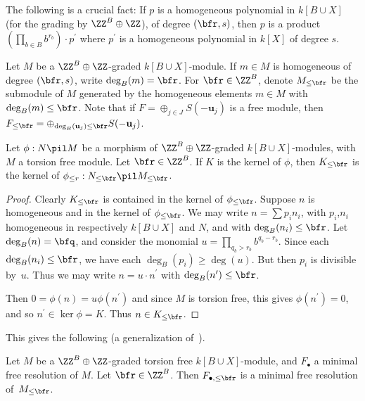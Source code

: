 The following is a crucial fact: If $p$ is a homogeneous
polynomial in $k[B \cup X]$ (for the grading by $\ZZ^B \oplus \ZZ$),
of degree $(\bfr,s)$, then $p$ is a product
$(\prod_{b \in B}b^{r_b}) \cdot p^\prime$ where $p^\prime$ is a homogeneous
polynomial in $k[X]$ of degree $s$.

Let $M$ be a $\ZZ^B \oplus \ZZ$-graded 
$k[B \cup X]$-module. If $m \in M$ is homogeneous of degree $(\bfr,s)$,
write $\deg_B(m) = \bfr$.
For $\bfr \in \ZZ^B$, denote $M_{\leq \bfr}$ be the
submodule of $M$ generated by the homogeneous elements $m \in M$
with $\deg_B(m) \leq \bfr$.
Note that if $F = \oplus_{j \in J} S(-{\mathbf u}_j)$ is a free module,
then $F_{\leq \bfr} = \oplus_{\deg_B({\mathbf u}_j) \leq \bfr} S(-{\mathbf u}_j)$.

\begin{lemma} Let $\phi : N \pil M$ be a morphism of $\ZZ^B \oplus \ZZ$-graded
  $k[B \cup X]$-modules, with $M$ a torsion free module. Let $\bfr \in \ZZ^B$. 
  If $K$ is the kernel of $\phi$, then $K_{\leq \bfr}$ is the kernel of
  $\phi_{\leq r} : N_{\leq \bfr} \pil M_{\leq \bfr}$.
\end{lemma}

\begin{proof} Clearly $K_{\leq \bfr}$ is contained in the kernel of
  $\phi_{\leq \bfr}$. 
  Suppose $n$ is homogeneous and
  in the kernel of $\phi_{\leq \bfr}$. We may write 
  $n = \sum p_i n_i$, with $p_i$,$n_i$ homogeneous in respectively $k[B \cup X]$ and $N$,
  and with $\deg_B(n_i) \leq \bfr$. Let $\deg_B(n) = \bfq$, 
  and consider the monomial
  $u = \prod_{q_b > r_b}b^{q_b - r_b}$. Since each $\deg_B(n_i) \leq \bfr$,
  we have each $\deg_B(p_i) \geq \deg(u)$. But then $p_i$ is
  divisible by~$u$. Thus we may write $n = u \cdot n^\prime$
  with $\deg_B(n^\prime) \leq \bfr$. 

  Then $0 = \phi(n) = u \phi(n^\prime)$ and since $M$ is torsion
  free, this gives $\phi(n^\prime) = 0$, and so $n^\prime \in \ker \phi = K$.
  Thus  $n \in K_{\leq \bfr}$.
\end{proof}

This gives the following (a generalization of~\cite[Thm.~2.1]{GaHiPe}).

\begin{coro}
  Let $M$ be a $\ZZ^B \oplus \ZZ$-graded torsion free $k[B \cup X]$-module,
  and $F_\bullet$ a minimal free resolution of $M$. Let $\bfr \in \ZZ^B$.
  Then $F_{\bullet, \leq \bfr}$ is a minimal free resolution of~$M_{\leq \bfr}$.
\end{coro}

